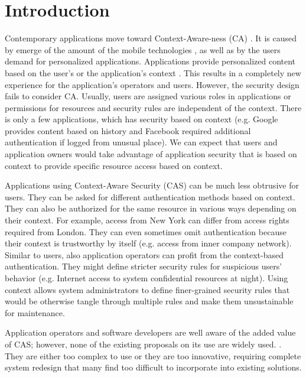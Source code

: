 \documentclass{sig-alternate}
\begin{document}
\section{Introduction}
Contemporary applications move toward Context-Aware-ness (CA) \cite{context,tomas1}. It is caused by emerge of the amount of the mobile technologies \cite{mobilecontext}, as well as by the users demand for personalized applications. Applications provide personalized content based on the user's or the application's context \cite{personalizedcontext}. This results in a completely new experience for the application's operators and users. However, the security design fails to consider CA. Usually, users are assigned various roles in applications or permissions for resources and security rules are independent of the context. There is only a few applications, which has security based on context (e.g. Google provides content based on history and Facebook required additional authentication if logged from unusual place). We can expect that users and application owners would take advantage of application security that is based on context to provide specific resource access based on context.

Applications using Context-Aware Security (CAS) can be much less obtrusive for users. They can be asked for different authentication methods based on context. They can also be authorized for the same resource in various ways depending on their context. For example, access from New York can differ from access rights required from London. They can even sometimes omit authentication because their context is trustworthy by itself (e.g. access from inner company network). Similar to users, also application operators can profit from the context-based authentication. They might define stricter security rules for suspicious users' behavior (e.g. Internet access to system confidential resources at night). Using context allows system administrators to define finer-grained security rules that would be otherwise tangle through multiple rules and make them unsustainable for maintenance. 

Application operators and software developers are well aware of the added value of CAS; however, none of the existing proposals on its use are widely used. \cite{ubiscom,envroles,hung,contextawarerbac,genericcontext,contextAwareMobile,grbac,xorbac,contextroles,eacl,contextaccess,wendong}. They are either too complex to use or they are too innovative, requiring complete system redesign that many find too difficult to incorporate into existing solutions.
\end{document}
